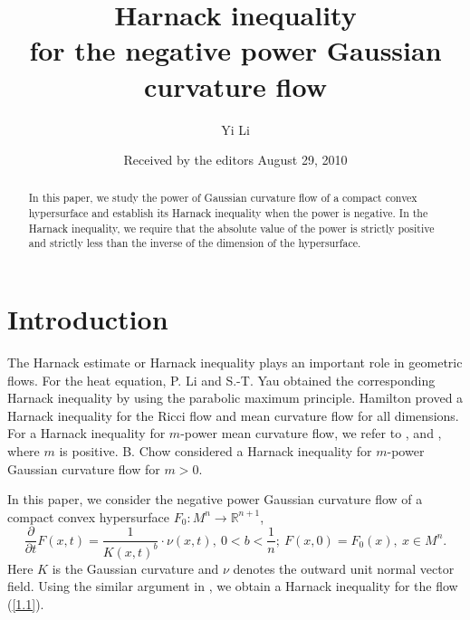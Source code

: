 \documentclass{amsart}
\theoremstyle{definition}
\theoremstyle{remark}
\numberwithin{equation}{section}
\begin{document}
\title{Harnack inequality\\for the negative power Gaussian curvature flow}

\author{Yi Li}

\address{Department of Mathematics, Harvard University, Cambridge, MA, 02138}


\date{Received by the editors August 29, 2010}



\begin{abstract} In this paper, we study the power of Gaussian curvature flow of a compact convex hypersurface and establish its Harnack inequality when the power
is negative. In the Harnack inequality, we require that the absolute value of the power is strictly positive and strictly less
than the inverse of the dimension of the hypersurface.
\end{abstract}

\maketitle

\section{Introduction}
The Harnack estimate or Harnack inequality plays an important role in geometric 
flows. For the heat
equation, P. Li and S.-T. Yau \cite{LY} obtained the corresponding Harnack inequality
by using the parabolic maximum principle. Hamilton \cite{H1, H2} proved a Harnack inequality for the Ricci flow and mean curvature flow for all dimensions. For a Harnack
inequality for $m$-power mean
curvature flow, we refer to \cite{A}, \cite{S} and \cite{W}, where $m$ is positive.
B. Chow \cite{C2} considered a Harnack inequality for $m$-power Gaussian
curvature flow for $m>0$.

In this paper, we consider the negative power Gaussian curvature flow of a compact convex hypersurface $F_{0}: M^{n}\to\mathbb{R}^{n+1}$,
\begin{equation}
\frac{\partial}{\partial t}F(x,t)=\frac{1}{K(x,t)^{b}}\cdot\nu(x,t), \
0<b<\frac{1}{n}; \
F(x,0)=F_{0}(x), \ x\in M^{n}.\label{1.1}
\end{equation}
Here $K$ is the Gaussian curvature and $\nu$ denotes the outward unit normal vector field. Using the similar argument in \cite{C2}, we obtain a Harnack inequality for
the flow (\ref{1.1}).
\end{document}
